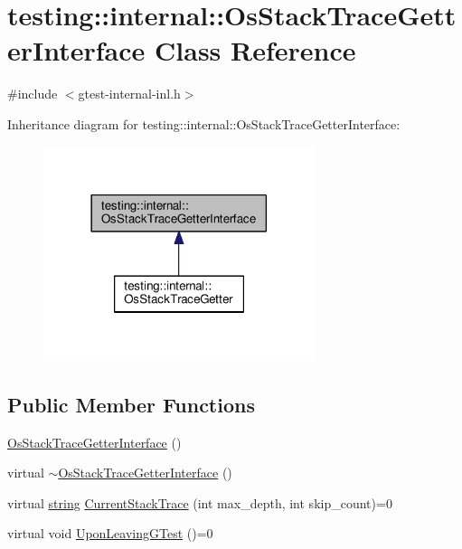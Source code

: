 \hypertarget{classtesting_1_1internal_1_1OsStackTraceGetterInterface}{}\section{testing\+:\+:internal\+:\+:Os\+Stack\+Trace\+Getter\+Interface Class Reference}
\label{classtesting_1_1internal_1_1OsStackTraceGetterInterface}


{\ttfamily \#include $<$gtest-\/internal-\/inl.\+h$>$}



Inheritance diagram for testing\+:\+:internal\+:\+:Os\+Stack\+Trace\+Getter\+Interface\+:\nopagebreak
\begin{figure}[H]
\begin{center}
\leavevmode
\includegraphics[width=225pt]{classtesting_1_1internal_1_1OsStackTraceGetterInterface__inherit__graph}
\end{center}
\end{figure}
\subsection*{Public Member Functions}
\begin{DoxyCompactItemize}
\item 
\hyperlink{classtesting_1_1internal_1_1OsStackTraceGetterInterface_afbe9eb0ca8775fbb98ff0720011b6708}{Os\+Stack\+Trace\+Getter\+Interface} ()
\item 
virtual \hyperlink{classtesting_1_1internal_1_1OsStackTraceGetterInterface_a193f4a1de4af9b78010c659912df5a15}{$\sim$\+Os\+Stack\+Trace\+Getter\+Interface} ()
\item 
virtual \hyperlink{namespacetesting_1_1internal_a8e8ff5b11e64078831112677156cb111}{string} \hyperlink{classtesting_1_1internal_1_1OsStackTraceGetterInterface_a6965eadb9b340808718fab9f1475c49a}{Current\+Stack\+Trace} (int max\+\_\+depth, int skip\+\_\+count)=0
\item 
virtual void \hyperlink{classtesting_1_1internal_1_1OsStackTraceGetterInterface_a791bd120428b5a53d5eeba1b27296a39}{Upon\+Leaving\+G\+Test} ()=0
\end{DoxyCompactItemize}
